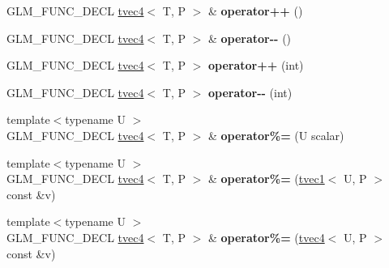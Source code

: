 \begin{DoxyCompactItemize}
\item 
\hypertarget{structglm_1_1tvec4_a63ee9187003ff40cb781a3cf3959475f}{G\-L\-M\-\_\-\-F\-U\-N\-C\-\_\-\-D\-E\-C\-L \hyperlink{structglm_1_1tvec4}{tvec4}$<$ T, P $>$ \& {\bfseries operator++} ()}\label{structglm_1_1tvec4_a63ee9187003ff40cb781a3cf3959475f}

\item 
\hypertarget{structglm_1_1tvec4_acf7152ff69c44483a6dcaa29926d25a3}{G\-L\-M\-\_\-\-F\-U\-N\-C\-\_\-\-D\-E\-C\-L \hyperlink{structglm_1_1tvec4}{tvec4}$<$ T, P $>$ \& {\bfseries operator-\/-\/} ()}\label{structglm_1_1tvec4_acf7152ff69c44483a6dcaa29926d25a3}

\item 
\hypertarget{structglm_1_1tvec4_ad341796b1b7f91afcea916911db25bc6}{G\-L\-M\-\_\-\-F\-U\-N\-C\-\_\-\-D\-E\-C\-L \hyperlink{structglm_1_1tvec4}{tvec4}$<$ T, P $>$ {\bfseries operator++} (int)}\label{structglm_1_1tvec4_ad341796b1b7f91afcea916911db25bc6}

\item 
\hypertarget{structglm_1_1tvec4_a57ff0a19184c138fab896a0f1743d442}{G\-L\-M\-\_\-\-F\-U\-N\-C\-\_\-\-D\-E\-C\-L \hyperlink{structglm_1_1tvec4}{tvec4}$<$ T, P $>$ {\bfseries operator-\/-\/} (int)}\label{structglm_1_1tvec4_a57ff0a19184c138fab896a0f1743d442}

\item 
\hypertarget{structglm_1_1tvec4_a02e8a331532d44e052509273241892df}{{\footnotesize template$<$typename U $>$ }\\G\-L\-M\-\_\-\-F\-U\-N\-C\-\_\-\-D\-E\-C\-L \hyperlink{structglm_1_1tvec4}{tvec4}$<$ T, P $>$ \& {\bfseries operator\%=} (U scalar)}\label{structglm_1_1tvec4_a02e8a331532d44e052509273241892df}

\item 
\hypertarget{structglm_1_1tvec4_ac71d67fa398069e9899bf5c420b1cc72}{{\footnotesize template$<$typename U $>$ }\\G\-L\-M\-\_\-\-F\-U\-N\-C\-\_\-\-D\-E\-C\-L \hyperlink{structglm_1_1tvec4}{tvec4}$<$ T, P $>$ \& {\bfseries operator\%=} (\hyperlink{structglm_1_1tvec1}{tvec1}$<$ U, P $>$ const \&v)}\label{structglm_1_1tvec4_ac71d67fa398069e9899bf5c420b1cc72}

\item 
\hypertarget{structglm_1_1tvec4_ae741cd1a5b5495e3cfbefa2721f8c46f}{{\footnotesize template$<$typename U $>$ }\\G\-L\-M\-\_\-\-F\-U\-N\-C\-\_\-\-D\-E\-C\-L \hyperlink{structglm_1_1tvec4}{tvec4}$<$ T, P $>$ \& {\bfseries operator\%=} (\hyperlink{structglm_1_1tvec4}{tvec4}$<$ U, P $>$ const \&v)}\label{structglm_1_1tvec4_ae741cd1a5b5495e3cfbefa2721f8c46f}


\end{DoxyCompactItemize}
